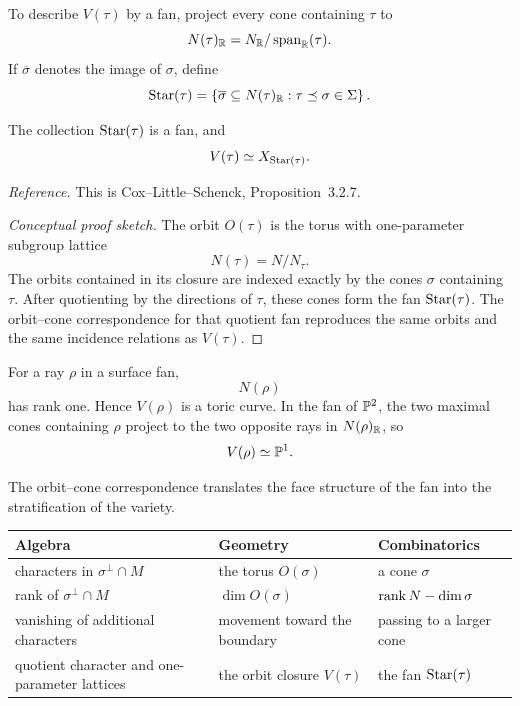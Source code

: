 To describe \(V(\tau)\) by a fan, project every cone containing
\(\tau\) to
\[
N(\tau)_{\mathbb{R}}
=
N_{\mathbb{R}}/\operatorname{span}_{\mathbb{R}}(\tau).
\]
If \(\overline{\sigma}\) denotes the image of \(\sigma\), define
\[
\operatorname{Star}(\tau)
=
\left\{
\overline{\sigma}\subseteq N(\tau)_{\mathbb{R}}:
\tau\preceq\sigma\in\Sigma
\right\}.
\]

\begin{proposition}
\label{prop:fan-of-orbit-closure}
The collection \(\operatorname{Star}(\tau)\) is a fan, and
\[
V(\tau)
\simeq
X_{\operatorname{Star}(\tau)}.
\]
\end{proposition}

\noindent
\textit{Reference.}
This is Cox--Little--Schenck, Proposition~3.2.7.

\begin{proof}[Conceptual proof sketch]
The orbit \(O(\tau)\) is the torus with one-parameter subgroup lattice
\[
N(\tau)=N/N_\tau.
\]
The orbits contained in its closure are indexed exactly by the cones
\(\sigma\) containing \(\tau\). After quotienting by the directions of
\(\tau\), these cones form the fan \(\operatorname{Star}(\tau)\).
The orbit--cone correspondence for that quotient fan reproduces the
same orbits and the same incidence relations as \(V(\tau)\).
\end{proof}

For a ray \(\rho\) in a surface fan,
\[
N(\rho)
\]
has rank one. Hence \(V(\rho)\) is a toric curve. In the fan of
\(\mathbb{P}^2\), the two maximal cones containing \(\rho\) project to the two
opposite rays in \(N(\rho)_{\mathbb{R}}\), so
\[
V(\rho)\simeq\mathbb{P}^1.
\]

\begin{threedictionaries}
The orbit--cone correspondence translates the face structure of the
fan into the stratification of the variety.

\medskip

\begin{center}
\small
\begin{tabularx}{\linewidth}{@{}
  >{\raggedright\arraybackslash}X
  >{\raggedright\arraybackslash}X
  >{\raggedright\arraybackslash}X@{}}
\toprule
\textbf{Algebra}
&
\textbf{Geometry}
&
\textbf{Combinatorics}
\\
\midrule
characters in \(\sigma^\perp\cap M\)
&
the torus \(O(\sigma)\)
&
a cone \(\sigma\)
\\[1mm]
rank of \(\sigma^\perp\cap M\)
&
\(\dim O(\sigma)\)
&
\(\operatorname{rank} N-\dim\sigma\)
\\[1mm]
vanishing of additional characters
&
movement toward the boundary
&
passing to a larger cone
\\[1mm]
quotient character and one-parameter lattices
&
the orbit closure \(V(\tau)\)
&
the fan \(\operatorname{Star}(\tau)\)
\\
\bottomrule
\end{tabularx}
\end{center}
\end{threedictionaries}

